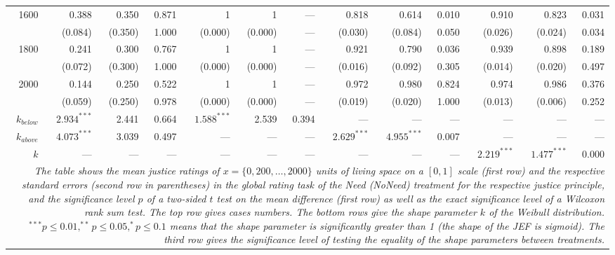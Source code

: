 \documentclass[12pt]{scrartcl}
\begin{document}
\begin{landscape}
\begin{table}[h!t!]
{\begin{tabular}{rrrrrrrrrrrrr}
            1600          &  0.388          &  0.350    & 0.871    &  1              &  1        & ---      &  0.818          &  0.614           & 0.010   &  0.910          &  0.823          & 0.031   \\
                          & (0.084)         & (0.350)   & 1.000    & (0.000)         & (0.000)   & ---      & (0.030)         & (0.084)          & 0.050   & (0.026)         & (0.024)         & 0.034   \\
            1800          &  0.241          &  0.300    & 0.767    &  1              &  1        & ---      &  0.921          &  0.790           & 0.036   &  0.939          &  0.898          & 0.189   \\
                          & (0.072)         & (0.300)   & 1.000    & (0.000)         & (0.000)   & ---      & (0.016)         & (0.092)          & 0.305   & (0.014)         & (0.020)         & 0.497   \\
            2000          &  0.144          &  0.250    & 0.522    &  1              &  1        & ---      &  0.972          &  0.980           & 0.824   &  0.974          &  0.986          & 0.376   \\
                          & (0.059)         & (0.250)   & 0.978    & (0.000)         & (0.000)   & ---      & (0.019)         & (0.020)          & 1.000   & (0.013)         & (0.006)         & 0.252   \\\hline
            $k_{below}$   & $2.934^{***}$   &  2.441    & 0.664    & $1.588^{***}$   &  2.539    & 0.394    & ---             & ---              & ---     & ---             & ---             & ---     \\
            $k_{above}$   & $4.073^{***}$   &  3.039    & 0.497    & ---             & ---       & ---      & $2.629^{***}$   & $4.955^{***}$    & 0.007   & ---             & ---             & ---     \\
            $k$           & ---             & ---       & ---      & ---             & ---       & ---      & ---             & ---              & ---     & $2.219^{***}$   & $1.477^{***}$   & 0.000   \\\hline
            \multicolumn{13}{p{0.85\linewidth}}{\footnotesize\textit{The table shows the mean justice ratings of $x=\{0,200,\ldots,2000\}$ units of living space on a $[0,1]$ scale (first row) and the respective standard errors (second row in parentheses) in the global rating task of the Need (NoNeed) treatment for the respective justice principle, and the significance level $p$ of a two-sided $t$ test on the mean difference (first row) as well as the exact significance level of a Wilcoxon rank sum test. The top row gives cases numbers. The bottom rows give the shape parameter $k$ of the Weibull distribution. $^{***}p\le0.01,^{**}p\le0.05,^{*}p\le0.1$ means that the shape parameter is significantly greater than 1 (the shape of the JEF is sigmoid). The third row gives the significance level of testing the equality of the shape parameters between treatments.}}
         \end{tabular}
      }
   \end{table}
\end{landscape}
\end{document}

